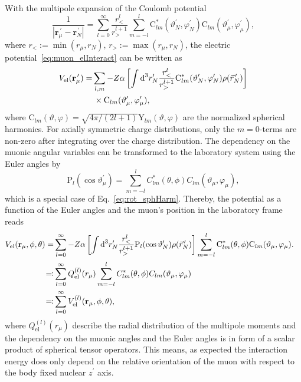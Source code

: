 With the multipole expansion of the Coulomb potential~\cite{jackson1999}
\begin{equation}
\frac{1}{|\mathbf{r}_\mu^{\,\prime}-\mathbf{r}_N^{\,\prime}|}=\sum_{l=0}^\infty \frac{r_<^l}{r_>^{l+1}}\sum_{m=-l}^l  \text{C}^*_{lm}(\vartheta_N^{\prime},\varphi_N^{\prime})\text{C}_{lm}(\vartheta_\mu^\prime,\varphi_\mu^\prime),
\end{equation}
where $r_<:=\min (r_\mu,r_N)$, $r_>:=\max (r_\mu,r_N)$, the electric potential~\eqref{eq:muon_elInteract} can be written as
\begin{align}
V_{\text{el}}(\mathbf{r}_\mu^{\,\prime})=&\sum_{l,m}-Z\alpha \left[ \int \text{d}^3r^{\prime}_N \frac{r_<^l}{r_>^{l+1}}\text{C}^*_{lm}(\vartheta_N^{\prime},\varphi_N^{\prime})\rho(\vec{r}_N^{\,\prime})\right]\notag\\
&\,\times\text{C}_{lm}(\vartheta_\mu^{\prime},\varphi_\mu^\prime),
\end{align}
where ${\text{C}_{lm}(\vartheta,\varphi)}{=}{\sqrt{4\pi/(2l+1)}\text{Y}_{lm}(\vartheta,\varphi)}$ are the normalized spherical harmonics.
For axially symmetric charge distributions, only the ${m}{=}{0}$-terms are non-zero after integrating over the charge distribution. The dependency on the muonic angular variables can be transformed to the laboratory system using the Euler angles by
\begin{equation}
\text{P}_{l}(\cos\vartheta_\mu^\prime)=
 \sum_{m=-l}^l C^*_{lm}(\theta,\phi)C_{lm}(\vartheta_\mu,\varphi_\mu),
\end{equation}
which is a special case of Eq.~\eqref{eq:rot_sphHarm}.
Thereby, the potential as a function of the Euler angles and the muon's position in the laboratory frame reads
\begin{align}
V_{\text{el}}(\mathbf{r}_\mu,\phi,\theta)=&\sum_{l=0}^\infty-Z\alpha \left[ \int \text{d}^3r^{\prime}_N \frac{r_<^l}{r_>^{l+1}}\text{P}_{l}(\cos \vartheta_N^{\prime})\rho(\vec{r}_N^{\,\prime})\right]\sum_{m=-l}^l \text{C}^*_{lm}(\theta,\phi)\text{C}_{lm}(\vartheta_\mu,\varphi_\mu).\notag\\
\eqqcolon &\sum_{l=0}^\infty Q_{\text{el}}^{(l)}(r_\mu)\sum_{m=-l}^lC^*_{lm}(\theta,\phi)C_{lm}(\vartheta_\mu,\varphi_\mu)&\notag\\
\eqqcolon& \sum_{l=0}^\infty V^{(l)}_{\text{el}}(\mathbf{r}_\mu,\phi,\theta),
\label{eq:defmulti}
\end{align}
where $Q_{\text{el}}^{(l)}(r_\mu)$ describe the radial distribution of the multipole moments and the dependency on the muonic angles and the Euler angles is in form of a scalar product of spherical tensor operators. This means, as expected the interaction energy does only depend on the relative orientation of the muon with respect to the body fixed nuclear $z^\prime$ axis.

